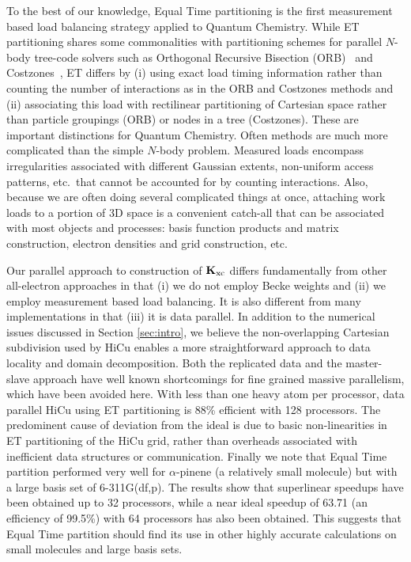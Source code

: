 \commentoutA{\documentclass[prl,aps,twocolumn,showpacs,twocolumngrid,superbib]{revtex4}}
\newcommand{\Kxc}{{\bf K}_{\mathrm{xc}}}
\begin{document}
To the best of our knowledge, Equal Time partitioning is the first
measurement based load balancing strategy applied to Quantum
Chemistry.  While ET partitioning shares some commonalities with
partitioning schemes for parallel $N$-body tree-code solvers such as
Orthogonal Recursive Bisection (ORB)~\cite{warren:92_article} and
Costzones~\cite{Singh93}, ET differs by (i) using exact load timing
information rather than counting the number of interactions as in the
ORB and Costzones methods and (ii) associating this load with
rectilinear partitioning of Cartesian space rather than particle
groupings (ORB) or nodes in a tree (Costzones).  These are important
distinctions for Quantum Chemistry.  Often methods are much more
complicated than the simple $N$-body problem.  Measured loads
encompass irregularities associated with different Gaussian extents,
non-uniform access patterns, etc.~that cannot be accounted for by
counting interactions.  Also, because we are often doing several
complicated things at once, attaching work loads to a portion of
3D space is a convenient catch-all that can be associated with most
objects and processes: basis function products and matrix construction,
electron densities and grid construction, etc.  

Our parallel approach to construction of $\Kxc$ differs fundamentally
from other all-electron approaches in that (i) we do not employ Becke
weights and (ii) we employ measurement based load balancing.  It is
also different from many implementations in that (iii) it is data
parallel.  In addition to the numerical issues discussed in Section
\ref{sec:intro}, we believe the non-overlapping Cartesian subdivision
used by HiCu enables a more straightforward approach to data locality
and domain decomposition.  Both the replicated data and the
master-slave approach have well known shortcomings for fine grained
massive parallelism, which have been avoided here.  With less than one
heavy atom per processor, data parallel HiCu using ET partitioning is
88\% efficient with 128 processors.  The predominent cause of
deviation from the ideal is due to basic non-linearities in ET
partitioning of the HiCu grid, rather than overheads associated with
inefficient data structures or communication.
Finally we note that Equal Time partition performed very well 
for $\alpha$-pinene (a relatively small molecule)
but with a large basis set of 6-311G(df,p).
The results show that superlinear speedups have been obtained 
up to 32 processors, while a near ideal speedup of 
63.71 (an efficiency of 99.5\%) with 64 processors has also been obtained.
This suggests that Equal Time partition should find its use in other
highly accurate calculations on small molecules and large basis sets.
\end{document}
